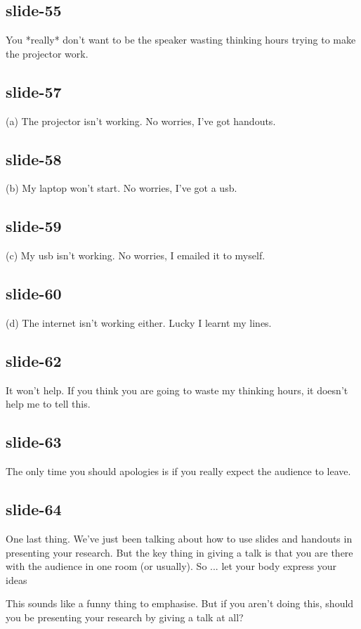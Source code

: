 \documentclass[12pt,\papersize]{extarticle}
\begin{document}
\subsection{slide-55}
You *really* don't want to be the speaker wasting thinking hours trying to make the 
projector work.
 
\subsection{slide-57}
(a) The projector isn't working.  No worries, I've got handouts.
 
\subsection{slide-58}
(b) My laptop won't start.  No worries, I've got a usb.
 
\subsection{slide-59}
(c) My usb isn't working.  No worries, I emailed it to myself.
 
\subsection{slide-60}
(d) The internet isn't working either.  Lucky I learnt my lines.
 
\subsection{slide-62}
It won't help.  If you think you are going to waste my thinking hours, it doesn't help
me to tell this.
 
\subsection{slide-63}
The only time you should apologies is if you really expect the 
audience to leave.
 
\subsection{slide-64}
One last thing.
We've just been talking about how to use slides and handouts in presenting your research.
But the key thing in giving a talk is that you are there with the audience in one room
(or usually).  So ...
let your body express your ideas
 
This sounds like a funny thing to emphasise.  
But if you aren't doing this, should you be presenting your research by giving a talk at all?
 
\end{document}
